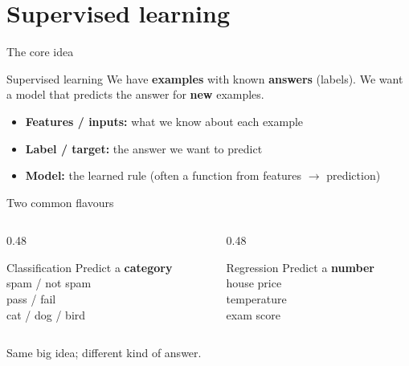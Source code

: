 \documentclass[aspectratio=169,11pt]{beamer}
\begin{document}
    \section{Supervised learning}

    \begin{frame}{The core idea}
        \begin{block}{Supervised learning}
            We have \textbf{examples} with known \textbf{answers} (labels).
            We want a model that predicts the answer for \textbf{new} examples.
        \end{block}
        \vspace{0.6em}
        \begin{itemize}
            \item \textbf{Features / inputs:} what we know about each example
            \item \textbf{Label / target:} the answer we want to predict
            \item \textbf{Model:} the learned rule (often a function from features $\rightarrow$ prediction)
        \end{itemize}
    \end{frame}

    \begin{frame}{Two common flavours}
        \begin{columns}[T]
            \begin{column}{0.48\textwidth}
                \begin{block}{Classification}
                    Predict a \textbf{category}\\[0.4em]
                    {\small spam / not spam\\
                    pass / fail\\
                    cat / dog / bird}
                \end{block}
            \end{column}
            \begin{column}{0.48\textwidth}
                \begin{block}{Regression}
                    Predict a \textbf{number}\\[0.4em]
                    {\small house price\\
                    temperature\\
                    exam score}
                \end{block}
            \end{column}
        \end{columns}
        \vspace{0.6em}
        Same big idea; different kind of answer.
    \end{frame}
\end{document}
